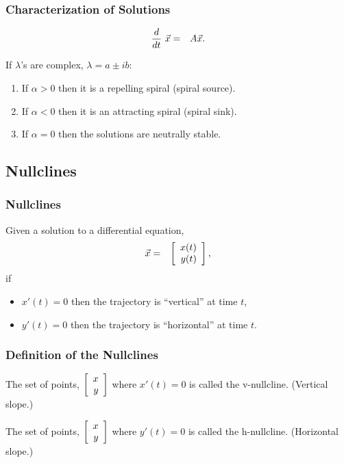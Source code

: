 \begin{frame}
  \frametitle{Characterization of Solutions}

  \begin{eqnarray*}
    \deriv{~}{t} \vec{x} & = & A \vec{x}.
  \end{eqnarray*}

  If $\lambda$'s are complex, $\lambda = a \pm ib$:
  \begin{enumerate}
  \item If $\alpha>0$ then it is a repelling spiral (spiral source).
  \item If $\alpha<0$ then it is an attracting spiral (spiral sink).
  \item If $\alpha=0$ then the solutions are neutrally stable.
  \end{enumerate}

\end{frame}


\subsection{Nullclines}

\begin{frame}
  \frametitle{Nullclines}

  Given a solution to a differential equation,
  \begin{eqnarray*}
    \vec{x} & = & \vecTwo{x(t)}{y(t)},
  \end{eqnarray*}
  if
  \begin{itemize}
  \item $x'(t)=0$ then the trajectory is ``vertical'' at time $t$,
  \item $y'(t)=0$ then the trajectory is ``horizontal'' at time $t$.
  \end{itemize}

\end{frame}


\begin{frame}
  \frametitle{Definition of the Nullclines}

  The set of points, $\vecTwo{x}{y}$ where $x'(t)=0$ is called the v-nullcline. (Vertical slope.)

  The set of points, $\vecTwo{x}{y}$ where $y'(t)=0$ is called the h-nullcline. (Horizontal slope.)

\end{frame}



